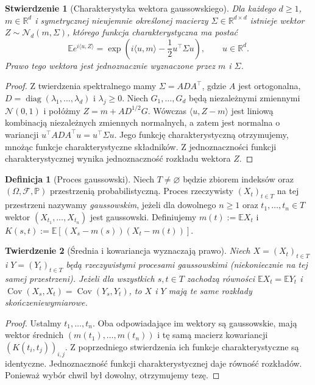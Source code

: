 \documentclass[11pt,a4paper,oneside]{report}
\numberwithin{equation}{chapter}
\theoremstyle{plain}
\newtheorem{twierdzenie}{Twierdzenie}[chapter]
\newtheorem{stwierdzenie}[twierdzenie]{Stwierdzenie}
\theoremstyle{definition}
\newtheorem{definicja}{Definicja}[chapter]
\theoremstyle{remark}
\newcommand{\R}{\mathbb{R}}
\newcommand{\Prob}{\mathbb{P}}
\newcommand{\E}{\mathbb{E}}
\newcommand{\Cov}{\operatorname{Cov}}
\newcommand{\calF}{\mathcal{F}}
\newcommand{\Normal}{\mathcal{N}}
\begin{document}
\begin{stwierdzenie}[Charakterystyka wektora gaussowskiego]
Dla każdego $d\ge1$, $m\in\R^d$ i symetrycznej nieujemnie
określonej macierzy $\Sigma\in\R^{d\times d}$ istnieje wektor
$Z\sim\Normal_d(m,\Sigma)$, którego funkcja charakterystyczna ma postać
\[
\E e^{i\langle u,Z\rangle}
=\exp\left(i\langle u,m\rangle-\frac12 u^\top\Sigma u\right),
\qquad u\in\R^d.
\]
Prawo tego wektora jest jednoznacznie wyznaczone przez $m$ i $\Sigma$.
\end{stwierdzenie}
\begin{proof}
Z twierdzenia spektralnego mamy $\Sigma=ADA^\top$, gdzie $A$
jest ortogonalna, $D=\operatorname{diag}(\lambda_1,\ldots,\lambda_d)$
i $\lambda_j\ge0$. Niech $G_1,\ldots,G_d$ będą niezależnymi
zmiennymi $\Normal(0,1)$ i połóżmy
$Z=m+AD^{1/2}G$. Wówczas
$\langle u,Z-m\rangle$ jest liniową kombinacją niezależnych
zmiennych normalnych, a zatem jest normalna o wariancji
$u^\top AD A^\top u=u^\top\Sigma u$. Jego funkcję charakterystyczną
otrzymujemy, mnożąc funkcje charakterystyczne składników.
Z jednoznaczności funkcji charakterystycznej wynika jednoznaczność
rozkładu wektora $Z$.
\end{proof}

\begin{definicja}[Proces gaussowski]
Niech $T\ne\varnothing$ będzie zbiorem indeksów oraz
$(\Omega,\calF,\Prob)$ przestrzenią probabilistyczną. Proces
rzeczywisty $(X_t)_{t\in T}$ na tej przestrzeni nazywamy
\emph{gaussowskim}, jeżeli dla dowolnego $n\ge1$ oraz
$t_1,\ldots,t_n\in T$ wektor $(X_{t_1},\ldots,X_{t_n})$
jest gaussowski. Definiujemy
$m(t):=\E X_t$ i $K(s,t):=\E[(X_s-m(s))(X_t-m(t))]$.
\end{definicja}

\begin{twierdzenie}[Średnia i kowariancja wyznaczają prawo]
Niech $X=(X_t)_{t\in T}$ i $Y=(Y_t)_{t\in T}$ będą rzeczywistymi
procesami gaussowskimi (niekoniecznie na tej samej przestrzeni).
Jeżeli dla wszystkich $s,t\in T$ zachodzą równości
$\E X_t=\E Y_t$ i $\Cov(X_s,X_t)=\Cov(Y_s,Y_t)$, to $X$ i $Y$
mają te same rozkłady skończeniewymiarowe.
\end{twierdzenie}
\begin{proof}
Ustalmy $t_1,\ldots,t_n$. Oba odpowiadające im wektory są
gaussowskie, mają wektor średnich
$(m(t_1),\ldots,m(t_n))$ i tę samą macierz kowariancji
$(K(t_i,t_j))_{i,j}$. Z poprzedniego stwierdzenia ich funkcje
charakterystyczne są identyczne. Jednoznaczność funkcji
charakterystycznej daje równość rozkładów. Ponieważ wybór chwil był
dowolny, otrzymujemy tezę.
\end{proof}
\end{document}
